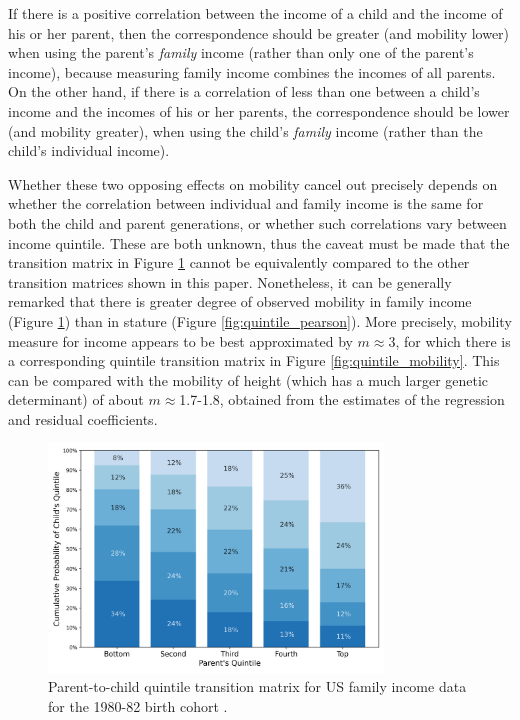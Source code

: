 \documentclass[a4paper,11pt]{article} %
\begin{document}
If there is a positive correlation between the income of a child and the income of his or her parent, then the correspondence should be greater (and mobility lower) when using the parent's \emph{family} income (rather than only one of the parent's income), because measuring family income combines the incomes of all parents. On the other hand, if there is a correlation of less than one between a child's income and the incomes of his or her parents, the correspondence should be lower (and mobility greater), when using the child's \emph{family} income (rather than the child's individual income). 

Whether these two opposing effects on mobility cancel out precisely depends on whether the correlation between individual and family income is the same for both the child and parent generations, or whether such correlations vary between income quintile. These are both unknown, thus the caveat must be made that the transition matrix in Figure \ref{fig:quintile_chetty} cannot be equivalently compared to the other transition matrices shown in this paper. Nonetheless, it can be generally remarked that there is greater degree of observed mobility in family income (Figure \ref{fig:quintile_chetty}) than in stature (Figure \ref{fig:quintile_pearson}). More precisely, mobility measure for income appears to be best approximated by $m \approx 3$, for which there is a corresponding quintile transition matrix in Figure \ref{fig:quintile_mobility}. This can be compared with the mobility of height (which has a much larger genetic determinant) of about $m \approx  $1.7-1.8, obtained from the estimates of the regression and residual coefficients.

\begin{figure}[H]
\centering
\advance\leftskip-0.4in
\includegraphics[width=3.5in]{figures/quintile-chetty.png} 
\caption{Parent-to-child quintile transition matrix for US family income data for the 1980-82 birth cohort \cite{chetty}.}
\label{fig:quintile_chetty}
\end{figure}
\end{document}
